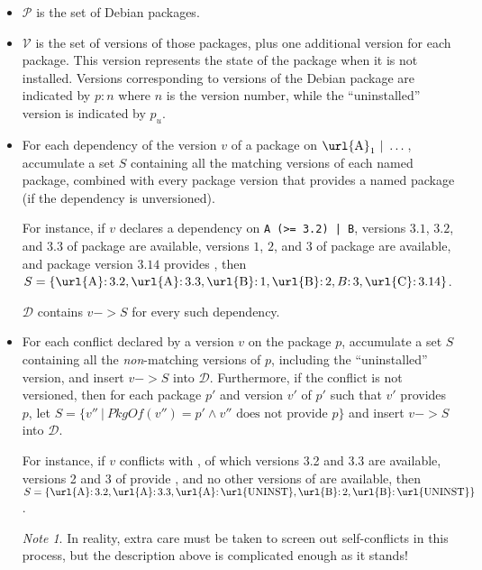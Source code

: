 \documentclass[letterpaper]{article}
\theoremstyle{definition}
\theoremstyle{remark}
\newtheorem*{note}{Note}
\newcommand{\pkg}[1]{\text{\url{#1}}}
\renewcommand{\P}{\mathcal{P}}
\newcommand{\V}{\mathcal{V}}
\newcommand{\D}{\mathcal{D}}
\newcommand{\pkgof}[1]{PkgOf(#1)}
\newcommand{\st}{\ |\ }
\newcommand{\col}{\mathpunct{:}}
\begin{document}
\begin{itemize}
\item $\P$ is the set of Debian packages.
\item $\V$ is the set of versions of those packages, plus one
  additional version for each package.  This version represents the
  state of the package when it is not installed.  Versions
  corresponding to versions of the Debian package are indicated by $p
  \col n$ where $n$ is the version number, while the ``uninstalled''
  version is indicated by $p_u$.
\item For each dependency of the version $v$ of a package on
  $\pkg{A}_1\ |\ \dots$, accumulate a set $S$ containing all the
  matching versions of each named package, combined with every package
  version that provides a named package (if the dependency is
  unversioned).

  For instance, if $v$ declares a dependency on \verb!A (>= 3.2) | B!,
  versions $3.1$, $3.2$, and $3.3$ of package \pkg{A} are available,
  versions $1$, $2$, and $3$ of package \pkg{B} are available, and
  package \pkg{C} version $3.14$ provides \pkg{B}, then
  $S=\{\pkg{A} \col 3.2,\pkg{A} \col 3.3,\pkg{B} \col 1,\pkg{B} \col 2,B \col 3,\pkg{C} \col 3.14\}$.

  $\D$ contains $v -> S$ for every such dependency.
\item For each conflict declared by a version $v$ on the package $p$,
  accumulate a set $S$ containing all the \emph{non}-matching versions
  of $p$, including the ``uninstalled'' version, and insert $v -> S$
  into $\D$.  Furthermore, if the conflict is not versioned, then for
  each package $p'$ and version $v'$ of $p'$ such that $v'$ provides
  $p$, let $S=\{v'' \st \pkgof{v''}=p' \land \text{$v''$ does not
    provide $p$}\}$ and insert $v -> S$ into $\D$.

  For instance, if $v$ conflicts with \pkg{A}, of which versions 3.2
  and 3.3 are available, versions 2 and 3 of \pkg{B} provide \pkg{A},
  and no other versions of \pkg{B} are available, then
  $S=\{\pkg{A} \col 3.2,\pkg{A} \col 3.3,\pkg{A} \col \pkg{UNINST},\pkg{B} \col 2,\pkg{B} \col \pkg{UNINST}\}$.

  \begin{note}
    In reality, extra care must be taken to screen out self-conflicts
    in this process, but the description above is complicated enough
    as it stands!
  \end{note}
\end{itemize}
\end{document}

